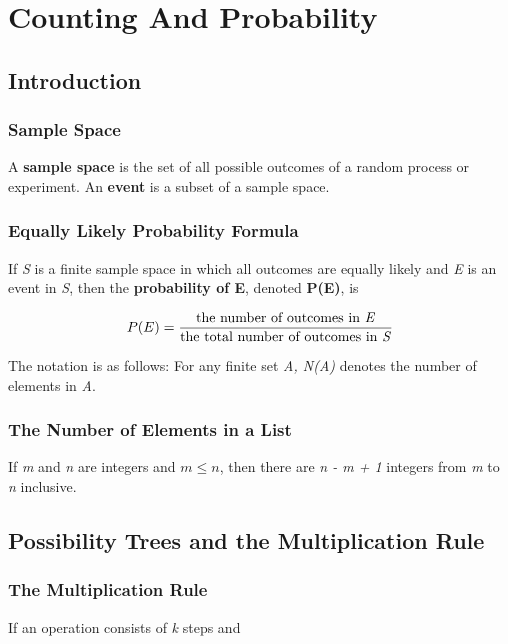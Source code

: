 \documentclass{article}
\begin{document}

\setcounter{section}{8}
\section{Counting And Probability}
\subsection{Introduction}

\subsubsection{Sample Space}
A \textbf{sample space} is the set of all possible outcomes of a random process or experiment. An \textbf{event} is a subset of a sample space.

\subsubsection{Equally Likely Probability Formula}
If \textit{S} is a finite sample space in which all outcomes are equally likely and \textit{E} is an event in \textit{S}, then the \textbf{probability of E}, denoted \textbf{P(E)}, is

\begin{equation}
P(E) = \frac{\text{the number of outcomes in \textit{E}}}{\text{the total number of outcomes in \textit{S}}}
\end{equation}

The notation is as follows: For any finite set \textit{A, N(A)} denotes the number of elements in \textit{A}.

\subsubsection{The Number of Elements in a List}
If \textit{m} and \textit{n} are integers and $m \leq n$, then there are \textit{n - m + 1} integers from \textit{m} to \textit{n} inclusive.

\subsection{Possibility Trees and the Multiplication Rule}
\subsubsection{The Multiplication Rule}
If an operation consists of \textit{k} steps and
\end{document}
